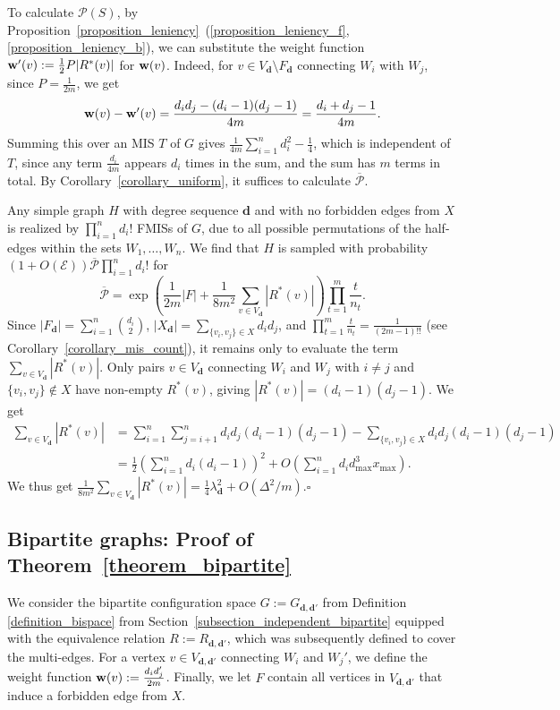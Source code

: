 \documentclass{article}
\theoremstyle{plain}
\theoremstyle{remark}
\theoremstyle{plain}
\numberwithin{equation}{section}
\renewcommand{\d}{{\boldsymbol{d}}}
\renewcommand{\b}{{\bf{w}}}
\begin{document}
	To calculate $\mathscr{P}(S)$, by Proposition~\ref{proposition_leniency}~(\ref{proposition_leniency_f},\ref{proposition_leniency_b}), we can substitute the weight function $\b'(v):=\frac12P|R^*(v)|$ for $\b(v)$. Indeed, for $v\in V_{\d}\setminus F_{\d}$ connecting $W_i$ with $W_j$, since $P=\frac1{2m}$, we get $$\b(v)-\b'(v)=\frac{d_id_j-(d_i-1)(d_j-1)}{4m}=\frac{d_i+d_j-1}{4m}.$$ Summing this over an MIS $T$ of $G$ gives $\frac1{4m}\sum_{i=1}^{n}d_i^2-\frac14$, which is independent of $T$, since any term $\frac{d_i}{4m}$ appears $d_i$ times in the sum, and the sum has $m$ terms in total. By Corollary~\ref{corollary_uniform}, it suffices to calculate $\overline{\mathscr{P}}$.
	
	Any simple graph $H$ with degree sequence $\d$ and with no forbidden edges from $X$ is realized by $\prod_{i=1}^{n}d_i!$ FMISs of $G$, due to all possible permutations of the half-edges within the sets $W_1,\ldots,W_n$. We find that $H$ is sampled with probability $(1+O(\mathscr{E}))\overline{\mathscr{P}}\prod_{i=1}^{n}d_i!$ for $$\overline{\mathscr{P}}=\exp\left(\frac1{2m}|F|+\frac1{8m^2}\sum_{v\in V_\d}|R^*(v)|\right)\prod_{t=1}^{m}\frac{t}{n_t}.$$ Since $|F_\d|=\sum_{i=1}^{n}\binom{d_i}{2}$, $|X_\d|=\sum_{\{v_i,v_j\}\in X}d_id_j$, and $\prod_{t=1}^{m}\frac{t}{n_t}=\frac1{(2m-1)!!}$ (see Corollary~\ref{corollary_mis_count}), it remains only to evaluate the term $\sum_{v\in V_\d}|R^*(v)|$. Only pairs $v\in V_\d$ connecting $W_i$ and $W_j$ with $i\neq j$ and $\{v_i,v_j\}\not\in X$ have non-empty $R^*(v)$, giving $|R^*(v)|=(d_i-1)(d_j-1)$. We get
	\begin{align}
		\sum_{v\in V_\d}|R^*(v)|
		&=\sum_{i=1}^{n}\sum_{j=i+1}^{n}d_id_j(d_i-1)(d_j-1)-\sum_{\{v_i,v_j\}\in X}d_id_j(d_i-1)(d_j-1)
		\\&=\frac12\left(\sum_{i=1}^{n}d_i(d_i-1)\right)^2+O\left(\sum_{i=1}^{n}d_id_{\max}^3x_{\max}\right).
	\end{align}
	We thus get $\frac1{8m^2}\sum_{v\in V_\d}|R^*(v)|=\frac14\lambda_\d^2+O(\Delta^2/m)$.\hfill$\square$
	
	\subsection{Bipartite graphs: Proof of Theorem~\ref{theorem_bipartite}}\label{subsection_applications_bipartite}
	
	We consider the bipartite configuration space $G:=G_{\d,\d'}$ from Definition \ref{definition_bispace} from Section~\ref{subsection_independent_bipartite} equipped with the equivalence relation $R:=R_{\d,\d'}$, which was subsequently defined to cover the multi-edges. For a vertex $v\in V_{\d,\d'}$ connecting $W_i$ and $W_j'$, we define the weight function $\b(v):=\tfrac{d_id_j'}{2m}$. Finally, we let $F$ contain all vertices in $V_{\d,\d'}$ that induce a forbidden edge from $X$.
	
\end{document}
